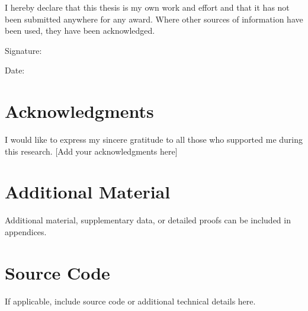 \documentclass[12pt,a4paper,twoside,openright]{report}
\theoremstyle{definition}
\theoremstyle{remark}
\begin{document}
I hereby declare that this thesis is my own work and effort and that it has not been submitted anywhere for any award. Where other sources of information have been used, they have been acknowledged.

\vspace{2cm}
\noindent
Signature: \hrulefill

\noindent
Date: \hrulefill

\chapter*{Acknowledgments}

I would like to express my sincere gratitude to all those who supported me during this research. [Add your acknowledgments here]

\tableofcontents

\listoffigures
{}

\listoftables
{}

\mainmatter







\backmatter




\appendix
\chapter{Additional Material}
\label{app:additional}

Additional material, supplementary data, or detailed proofs can be included in appendices.

\chapter{Source Code}
\label{app:code}

If applicable, include source code or additional technical details here.
\end{document}
